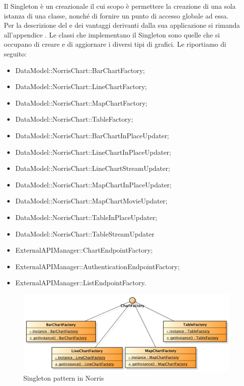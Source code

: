 			Il Singleton è un  creazionale il cui scopo è permettere la creazione di una sola istanza di una classe, nonché di fornire un punto di accesso globale ad essa.\\
			Per la descrizione del  e dei vantaggi derivanti dalla sua applicazione si rimanda all'appendice .
				Le classi che implementano il Singleton sono quelle che si occupano di creare e di aggiornare i diversi tipi di grafici. Le riportiamo di seguito:
				\begin{itemize}
					\item DataModel::NorrisChart::BarChartFactory;
					\item DataModel::NorrisChart::LineChartFactory;
					\item DataModel::NorrisChart::MapChartFactory;
					\item DataModel::NorrisChart::TableFactory;
					\item DataModel::NorrisChart::BarChartInPlaceUpdater;
					\item DataModel::NorrisChart::LineChartInPlaceUpdater;
					\item DataModel::NorrisChart::LineChartStreamUpdater;
					\item DataModel::NorrisChart::MapChartInPlaceUpdater;
					\item DataModel::NorrisChart::MapChartMovieUpdater;
					\item DataModel::NorrisChart::TableInPlaceUpdater;
					\item DataModel::NorrisChart::TableStreamUpdater
					\item ExternalAPIManager::ChartEndpointFactory;
					\item ExternalAPIManager::AuthenticationEndpointFactory;
					\item ExternalAPIManager::ListEndpointFactory.
				\end{itemize}
				\begin{figure}[H]\centering
	        		\includegraphics[width=\textwidth]{SpecificaTecnica/Pics/DesignPatternNorris/Singleton2}
	        		\caption{Singleton pattern in Norris}
	    		\end{figure}
